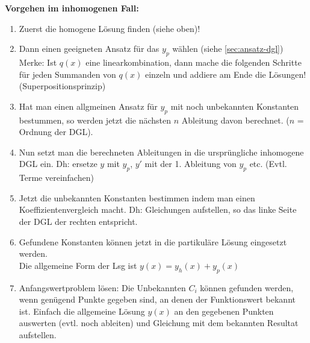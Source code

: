 \textbf{\textbf{Vorgehen im inhomogenen Fall:}}
\begin{enumerate}[leftmargin=0.3cm]
	\item Zuerst die homogene Lösung finden (siehe oben)!

	\item Dann einen geeigneten Ansatz für das $y_p$ wählen (siehe \ref{sec:ansatz-dgl})\\
	Merke: Ist $q(x)$ eine linearkombination, dann mache die folgenden Schritte für jeden Summanden von $q(x)$ einzeln und addiere am Ende die Lösungen! (Superpositionsprinzip)

	\item Hat man einen allgmeinen Ansatz für $y_p$ mit noch unbekannten Konstanten bestummen, so werden jetzt die nächsten $n$ Ableitung davon berechnet. ($n$ = Ordnung der DGL). 

	\item Nun setzt man die berechneten Ableitungen in die ursprüngliche inhomogene DGL ein. Dh: ersetze $y$ mit $y_p$, $y'$ mit der 1. Ableitung von $y_p$ etc. (Evtl. Terme vereinfachen)

	\item Jetzt die unbekannten Konstanten bestimmen indem man einen Koeffizientenvergleich macht. Dh: Gleichungen aufstellen, so das linke Seite der DGL der rechten entspricht. 

	\item Gefundene Konstanten können jetzt in die partikuläre Lösung eingesetzt werden.\\
	Die allgemeine Form der Lsg ist $y(x) = y_h(x) + y_p(x)$

	\item Anfangswertproblem lösen: Die Unbekannten $C_i$ können gefunden werden, wenn genügend Punkte gegeben sind, an denen der Funktionswert bekannt ist. Einfach die allgemeine Lösung $y(x)$ an den gegebenen Punkten auswerten (evtl. noch ableiten) und Gleichung mit dem bekannten Resultat aufstellen.
\end{enumerate}

